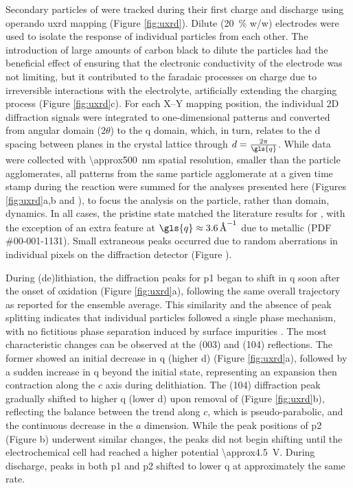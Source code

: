 \documentclass{article}
\begin{document}
Secondary particles of \nca{} were tracked during their first charge
and discharge using operando \gls{uxrd} mapping (Figure
\ref{fig:uxrd}). Dilute (\SI{20}{\percent} w/w) \nca{} electrodes were
used to isolate the response of individual particles from each
other. The introduction of large amounts of carbon black to dilute the
particles had the beneficial effect of ensuring that the electronic
conductivity of the electrode was not limiting, but it contributed to
the faradaic processes on charge due to irreversible interactions with
the electrolyte\cite{kostecki2014}, artificially extending the
charging process (Figure \ref{fig:uxrd}c). For each X--Y mapping
position, the individual 2D diffraction signals were integrated to
one-dimensional patterns and converted from angular domain ($2\theta$)
to the \gls{q} domain, which, in turn, relates to the \gls{d} spacing
between planes in the crystal lattice through
$d=\frac{2\pi}{\gls{q}}$. While data were collected with
\SI{\approx500}{\nano\meter} spatial resolution, smaller than the
particle agglomerates, all patterns from the same particle agglomerate
at a given time stamp during the reaction were summed for the analyses
presented here (Figures \ref{fig:uxrd}a,b and
), to focus the analysis on the particle,
rather than domain, dynamics. In all cases, the pristine state matched
the literature results for \nca{} \cite{novak2015}, with the exception
of an extra feature at $\gls{q}\approx\SI{3.6}{\per\angstrom}$ due to
metallic  (PDF \#00-001-1131). Small extraneous peaks occurred
due to random aberrations in individual pixels on the diffraction
detector (Figure ).

During (de)lithiation, the diffraction peaks for \gls{p1} began to
shift in \gls{q} soon after the onset of oxidation (Figure
\ref{fig:uxrd}a), following the same overall trajectory as reported
for the ensemble average\cite{robert2015}. This similarity and the
absence of peak splitting indicates that individual particles followed
a single phase mechanism, with no fictitious phase separation induced
by surface impurities \cite{grenier2017}. The most characteristic
changes can be observed at the (003) and (104) reflections. The former
showed an initial decrease in \gls{q} (higher \gls{d}) (Figure
\ref{fig:uxrd}a), followed by a sudden increase in \gls{q} beyond the
initial state, representing an expansion then contraction along the
$c$ axis during delithiation\cite{robert2015}. The (104) diffraction
peak gradually shifted to higher \gls{q} (lower \gls{d}) upon removal
of  (Figure \ref{fig:uxrd}b), reflecting the balance between
the trend along $c$, which is pseudo-parabolic, and the continuous
decrease in the $a$ dimension.\cite{robert2015} While the peak
positions of \gls{p2} (Figure b) underwent
similar changes, the peaks did not begin shifting until the
electrochemical cell had reached a higher potential
\SI{\approx4.5}{\volt}. During discharge, peaks in both \gls{p1} and
\gls{p2} shifted to lower \gls{q} at approximately the same rate.
\end{document}
